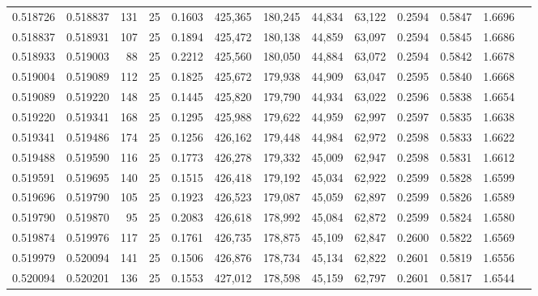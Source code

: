 \begin{tabular}{rrrrrrrrrrrrr}
0.518726 & 0.518837 &   131 &  25 &                                     0.1603 & 425,365 & 180,245 &  44,834 &  63,122 & 0.2594 & 0.5847 & 1.6696 \\
0.518837 & 0.518931 &   107 &  25 &                                     0.1894 & 425,472 & 180,138 &  44,859 &  63,097 & 0.2594 & 0.5845 & 1.6686 \\
0.518933 & 0.519003 &    88 &  25 &                                     0.2212 & 425,560 & 180,050 &  44,884 &  63,072 & 0.2594 & 0.5842 & 1.6678 \\
0.519004 & 0.519089 &   112 &  25 &                                     0.1825 & 425,672 & 179,938 &  44,909 &  63,047 & 0.2595 & 0.5840 & 1.6668 \\
0.519089 & 0.519220 &   148 &  25 &                                     0.1445 & 425,820 & 179,790 &  44,934 &  63,022 & 0.2596 & 0.5838 & 1.6654 \\
0.519220 & 0.519341 &   168 &  25 &                                     0.1295 & 425,988 & 179,622 &  44,959 &  62,997 & 0.2597 & 0.5835 & 1.6638 \\
0.519341 & 0.519486 &   174 &  25 &                                     0.1256 & 426,162 & 179,448 &  44,984 &  62,972 & 0.2598 & 0.5833 & 1.6622 \\
0.519488 & 0.519590 &   116 &  25 &                                     0.1773 & 426,278 & 179,332 &  45,009 &  62,947 & 0.2598 & 0.5831 & 1.6612 \\
0.519591 & 0.519695 &   140 &  25 &                                     0.1515 & 426,418 & 179,192 &  45,034 &  62,922 & 0.2599 & 0.5828 & 1.6599 \\
0.519696 & 0.519790 &   105 &  25 &                                     0.1923 & 426,523 & 179,087 &  45,059 &  62,897 & 0.2599 & 0.5826 & 1.6589 \\
0.519790 & 0.519870 &    95 &  25 &                                     0.2083 & 426,618 & 178,992 &  45,084 &  62,872 & 0.2599 & 0.5824 & 1.6580 \\
0.519874 & 0.519976 &   117 &  25 &                                     0.1761 & 426,735 & 178,875 &  45,109 &  62,847 & 0.2600 & 0.5822 & 1.6569 \\
0.519979 & 0.520094 &   141 &  25 &                                     0.1506 & 426,876 & 178,734 &  45,134 &  62,822 & 0.2601 & 0.5819 & 1.6556 \\
0.520094 & 0.520201 &   136 &  25 &                                     0.1553 & 427,012 & 178,598 &  45,159 &  62,797 & 0.2601 & 0.5817 & 1.6544 \\

\end{tabular}

